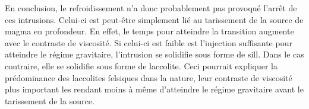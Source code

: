 En conclusion, le refroidissement n’a donc probablement pas provoqué
l’arrêt de ces intrusions. Celui-ci est peut-être simplement lié au
tarissement de la source de magma en profondeur. En effet, le temps
pour atteindre la transition augmente avec le contraste de viscosité.
Si celui-ci est faible est l'injection suffisante pour atteindre le
régime gravitaire, l'intrusion se solidifie sous forme de sill. Dans
le cas contraire, elle se solidifie sous forme de laccolite. Ceci
pourrait expliquer la prédominance des laccolites felsiques dans la
nature, leur contraste de viscosité plus important les rendant moins à
même d'atteindre le régime gravitaire avant le tarissement de la
source.


